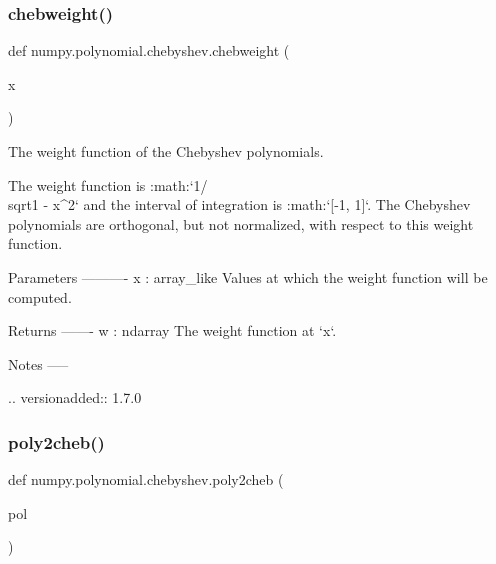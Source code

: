 \subsubsection{\texorpdfstring{chebweight()}{chebweight()}}
{\footnotesize\ttfamily def numpy.\+polynomial.\+chebyshev.\+chebweight (\begin{DoxyParamCaption}\item[{}]{x }\end{DoxyParamCaption})}

\begin{DoxyVerb}The weight function of the Chebyshev polynomials.

The weight function is :math:`1/\\sqrt{1 - x^2}` and the interval of
integration is :math:`[-1, 1]`. The Chebyshev polynomials are
orthogonal, but not normalized, with respect to this weight function.

Parameters
----------
x : array_like
   Values at which the weight function will be computed.

Returns
-------
w : ndarray
   The weight function at `x`.

Notes
-----

.. versionadded:: 1.7.0\end{DoxyVerb}
 \mbox{\label{namespacenumpy_1_1polynomial_1_1chebyshev_ac3147f174c1654fa14a00a56164e7972}} 
\subsubsection{\texorpdfstring{poly2cheb()}{poly2cheb()}}
{\footnotesize\ttfamily def numpy.\+polynomial.\+chebyshev.\+poly2cheb (\begin{DoxyParamCaption}\item[{}]{pol }\end{DoxyParamCaption})}

